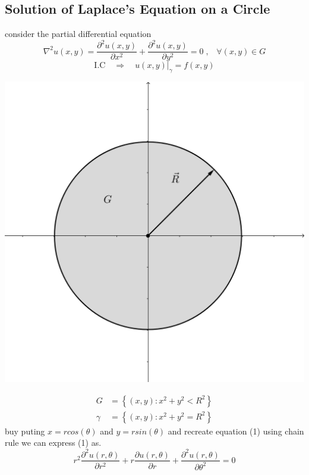 \documentclass[]{article}
\begin{document}
\setcounter{equation}{0}
\subsection{Solution of Laplace's Equation on a Circle}

consider the partial differential equation
\begin{equation}
\nabla^2 u(x,y) = \frac{\partial^2 u(x,y)}{\partial x^2} + \frac{\partial^2 u(x,y)}{\partial y^2} = 0\;, \;\;\; \forall (x,y) \in G
\end{equation}
\begin{equation}
\text{I.C} \quad \Longrightarrow \quad u(x,y)|_\gamma = f(x,y)
\end{equation}

\begin{center}
\includegraphics[scale=0.17]{circle.png}
\end{center}
\begin{align*}
G &= \left\lbrace (x,y):x^2+y^2 < R^2 \right\rbrace
\\
\gamma &= \left\lbrace (x,y):x^2+y^2 = R^2 \right\rbrace
\end{align*}
buy puting $x = r cos(\theta)$ and $y = r sin(\theta)$ and recreate equation (1) using chain rule we can express (1) as.
\begin{equation}
r^2 \frac{\partial^2 u(r,\theta)}{\partial r^2} + r \frac{\partial u(r,\theta)}{\partial r} + \frac{\partial^2 u(r,\theta)}{\partial \theta^2} = 0
\end{equation}
\end{document}
